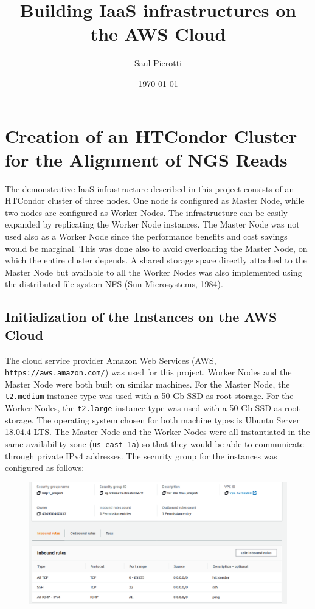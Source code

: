\documentclass{article}
\begin{document}
\title{Building IaaS infrastructures on the AWS Cloud}
\author{Saul Pierotti}
\date{\today}

\maketitle

\section{Creation of an HTCondor Cluster for the Alignment of NGS Reads}
The demonstrative IaaS infrastructure described in this project consists of an HTCondor cluster of three nodes.
One node is configured as Master Node, while two nodes are configured as Worker Nodes.
The infrastructure can be easily expanded by replicating the Worker Node instances.
The Master Node was not used also as a Worker Node since the performance benefits and cost savings would be marginal.
This was done also to avoid overloading the Master Node, on which the entire cluster depends.
A shared storage space directly attached to the Master Node but available to all the Worker Nodes was also implemented using the distributed file system NFS (Sun Microsystems, 1984).

\subsection{Initialization of the Instances on the AWS Cloud}
The cloud service provider Amazon Web Services (AWS, \texttt{https://aws.amazon.com/}) was used for this project.
Worker Nodes and the Master Node were both built on similar machines.
For the Master Node, the \texttt{t2.medium} instance type was used with a 50 Gb SSD as root storage.
For the Worker Nodes, the \texttt{t2.large} instance type was used with a 50 Gb SSD as root storage.
The operating system chosen for both machine types is Ubuntu Server 18.04.4 LTS.
The Master Node and the Worker Nodes were all instantiated in the same availability zone (\texttt{us-east-1a}) so that they would be able to communicate through private IPv4 addresses.
The security group for the instances was configured as follows:

\begin{figure}[!h]
    \center
    \includegraphics[width=\textwidth]{./images/security-group.png}
\end{figure}
\end{document}
